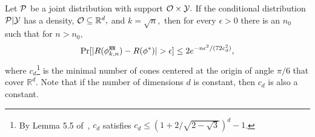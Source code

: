 \begin{theo} 
\label{thm:covergence of kNN}
Let $\mathcal{P}$ be a joint distribution with  support  $\mathcal{O} \times \mathcal{Y}.$ If the conditional distribution $\mathcal{P}|\mathcal{Y}$ has a density, $\mathcal{O} \subseteq \mathbb{R}^d,$ and $k = \sqrt{n},$ then for every $\epsilon >0$ there is an $n_0$ such that for $n>n_0,$ 
{\small
    \begin{align*}
        \Pr[|R(\phi^{\mathtt{NN}}_{k, n}) - R(\phi^{*})| > \epsilon] \leq 2e^{-n\epsilon^2/(72c^2_d)},
    \end{align*}
}
where $c_d$\footnote{By Lemma 5.5 of~\cite{Books:DGL96}, $c_d$ satisfies $c_d \leq (1+{2}/{\sqrt{2-\sqrt{3}}})^d - 1$.} is the minimal number of cones centered at the origin of angle $\pi/6$ that cover $\mathbb{R}^d.$ Note that if the number of dimensions $d$ is constant, then $c_d$ is also a constant.
\end{theo}







